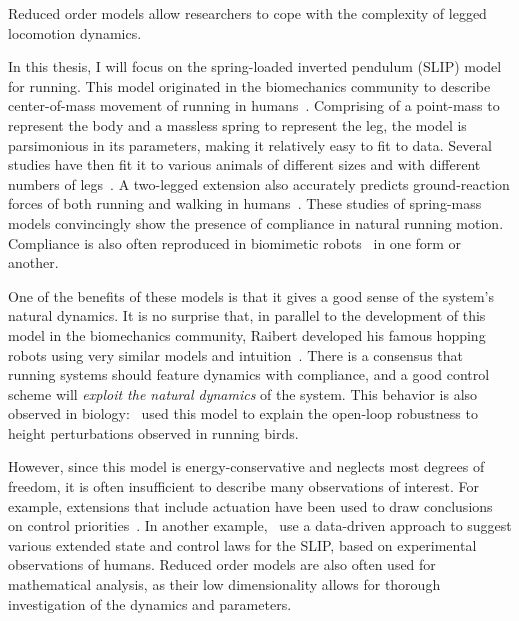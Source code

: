 Reduced order models allow researchers to cope with the complexity of legged locomotion dynamics. \par
In this thesis, I will focus on the spring-loaded inverted pendulum (SLIP) model for running. This model originated in the biomechanics community to describe center-of-mass movement of running in humans~\cite{blickhan1989spring}. Comprising of a point-mass to represent the body and a massless spring to represent the leg, the model is parsimonious in its parameters, making it relatively easy to fit to data.
Several studies have then fit it to various animals of different sizes and with different numbers of legs~\cite{blickhan1993similarity,daley2006running,jindrich2002dynamic}. A two-legged extension also accurately predicts ground-reaction forces of both running and walking in humans~\cite{geyer2006compliant}. These studies of spring-mass models convincingly show the presence of compliance in natural running motion. Compliance is also often reproduced in biomimetic robots~\cite{sprowitz2013cheetah,buchli2006resonance,hubicki2016atrias,hutter2016anymal,kenneally2016design,ramos2018facilitating} in one form or another. \par
One of the benefits of these models is that it gives a good sense of the system's natural dynamics.
It is no surprise that, in parallel to the development of this model in the biomechanics community, Raibert developed his famous hopping robots using very similar models and intuition~\cite[see Figure 2.5]{raibert1986legged}.
There is a consensus that running systems should feature dynamics with compliance, and a good control scheme will \emph{exploit the natural dynamics} of the system.
This behavior is also observed in biology:~\textcite{daley2006running} used this model to explain the open-loop robustness to height perturbations observed in running birds. \par
However, since this model is energy-conservative and neglects most degrees of freedom, it is often insufficient to describe many observations of interest. For example, extensions that include actuation have been used to draw conclusions on control priorities~\cite{Birn-Jeffery3786,blum2014swing}. In another example,~\textcite{maus2015constructing} use a data-driven approach to suggest various extended state and control laws for the SLIP, based on experimental observations of humans. %
Reduced order models are also often used for mathematical analysis, as their low dimensionality allows for thorough investigation of the dynamics and parameters.
